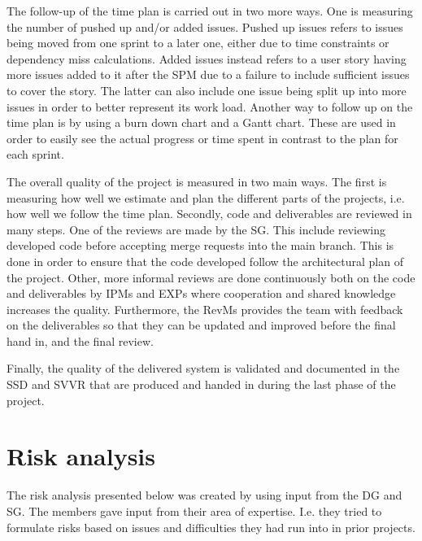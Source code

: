 \documentclass{article}
\begin{document}
The follow-up of the time plan is carried out in two more ways. One is measuring the number of pushed up and/or added issues. Pushed up issues refers to issues being moved from one sprint to a later one, either due to time constraints or dependency miss calculations. Added issues instead refers to a user story having more issues added to it after the SPM due to a failure to include sufficient issues to cover the story. The latter can also include one issue being split up into more issues in order to better represent its work load.
Another way to follow up on the time plan is by using a burn down chart and a Gantt chart. These are used in order to easily see the actual progress or time spent in contrast to the plan for each sprint. 

The overall quality of the project is measured in two main ways. The first is measuring how well we estimate and plan the different parts of the projects, i.e. how well we follow the time plan. Secondly, code and deliverables are reviewed in many steps. One of the reviews are made by the SG. This include reviewing developed code before accepting merge requests into the main branch. This is done in order to ensure that the code developed follow the architectural plan of the project. Other, more informal reviews are done continuously both on the code and deliverables by IPMs and EXPs where cooperation and shared knowledge increases the quality. Furthermore, the RevMs provides the team with feedback on the deliverables so that they can be updated and improved before the final hand in, and the final review. 

Finally, the quality of the delivered system is validated and documented in the SSD and SVVR that are produced and handed in during the last phase of the project.

\section{Risk analysis}
The risk analysis presented below was created by using input from the DG and SG. The members gave input from their area of expertise. I.e. they tried to formulate risks based on issues and difficulties they had run into in prior projects. 
\end{document}
